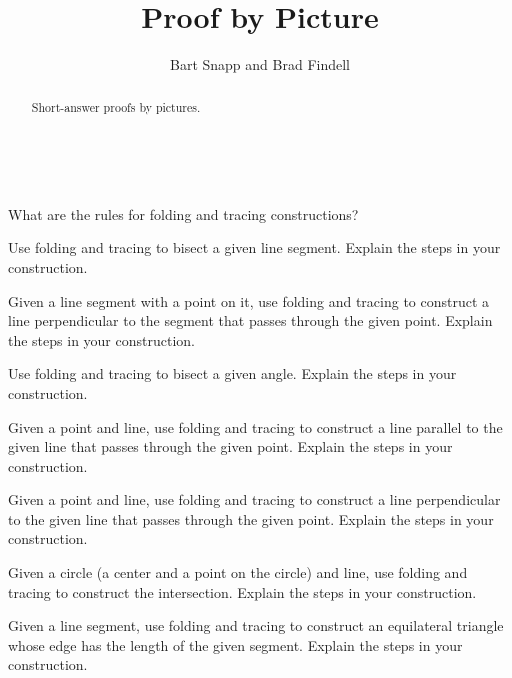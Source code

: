 \documentclass[nooutcomes]{ximera}
\title{Proof by Picture}
\author{Bart Snapp and Brad Findell}
\begin{document}
\begin{abstract}
Short-answer proofs by pictures. 
\end{abstract}
\maketitle

\

\begin{problem}
What are the rules for folding and tracing constructions?
\end{problem}

\begin{problem}
Use folding and tracing to bisect a given line segment. Explain the steps in
  your construction.
\end{problem}

\begin{problem}
Given a line segment with a point on it, use folding and tracing to
  construct a line perpendicular to the segment that passes through
  the given point. Explain the steps in your construction.
\end{problem}

\begin{problem}
Use folding and tracing to bisect a given angle. Explain the steps in your
  construction.
\end{problem}

\begin{problem}
Given a point and line, use folding and tracing to construct a line parallel
  to the given line that passes through the given point. Explain the
  steps in your construction.
\end{problem}

\begin{problem}
Given a point and line, use folding and tracing to construct a line
  perpendicular to the given line that passes through the given
  point. Explain the steps in your construction.
\end{problem}

\begin{problem}
Given a circle (a center and a point on the circle) and line,
  use folding and tracing to construct the intersection. Explain the steps in your
  construction.
\end{problem}

\begin{problem}
Given a line segment, use folding and tracing to construct an equilateral
  triangle whose edge has the length of the given segment. Explain the
  steps in your construction.
\end{problem}
\end{document}
